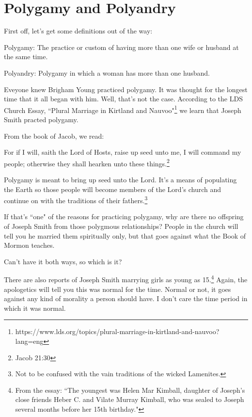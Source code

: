 \chapter{Polygamy and Polyandry}

First off, let's get some definitions out of the way:

\begin{displayquote}
Polygamy: The practice or custom of having more than one wife or husband at the same 
time.
\end{displayquote}

\begin{displayquote}
Polyandry: Polygamy in which a woman has more than one husband.
\end{displayquote}

Eveyone knew Brigham Young practiced polygamy. It was thought for the longest time 
that it all began with him. Well, that's not the case. According to the LDS Church
Essay, ``Plural Marriage in Kirtland and Nauvoo"\footnote{
https://www.lds.org/topics/plural-marriage-in-kirtland-and-nauvoo?lang=eng
} we learn that Joseph Smith practed polygamy.

From the book of Jacob, we read:

\begin{displayquote}
For if I will, saith the Lord of Hosts, raise up seed unto me, 
I will command my people; otherwise they shall hearken unto these 
things.\footnote{Jacob 21:30}
\end{displayquote}

Polygamy is meant to bring up seed unto the Lord. It's a means of populating the
Earth so those people will become members of the Lord's church and continue on with
the traditions of their fathers.\footnote{Not to be confused with the vain traditions
of the wicked Lamenites.}

If that's ``one" of the reasons for practicing polygamy, why are there no offspring
of Joseph Smith from those polygmous relationships? People in the church will tell
you he married them spiritually only, but that goes against what the Book of Mormon
teaches.

Can't have it both ways, so which is it?

There are also reports of Joseph Smith marrying girls as young as 15.\footnote{
From the essay: ``The youngest was Helen Mar Kimball, daughter of Joseph's close 
friends Heber C. and Vilate Murray Kimball, who was sealed to Joseph several 
months before her 15th birthday."
} Again, the apologetics will tell you this was normal for the time. Normal or not,
it goes against any kind of morality a person should have. I don't care the time
period in which it was normal.

